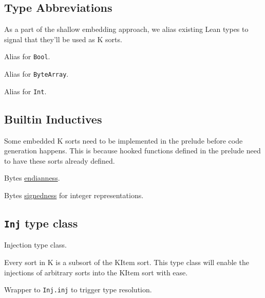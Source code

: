 \subsection{Type Abbreviations}

As a part of the shallow embedding approach, we alias existing Lean types to
signal that they'll be used as K sorts.

\begin{definition}[SortBool]\label{def:SortBool}\leanok
Alias for \texttt{Bool}.
\end{definition}
\begin{definition}[SortBytes]\label{def:SortBytes}\leanok
Alias for \texttt{ByteArray}.
\end{definition}
\begin{definition}[SortInt]\label{def:SortInt}\leanok
Alias for \texttt{Int}.
\end{definition}

\subsection{Builtin Inductives}

Some embedded K sorts need to be implemented in the prelude before code
generation happens. This is because hooked functions defined in the prelude need
to have these sorts already defined.

\begin{definition}[SortEndianness]\label{def:SortEndianness}\leanok
Bytes \href{https://en.wikipedia.org/wiki/Endianness}{endianness}.
\end{definition}
\begin{definition}[SortSignedness]\label{def:SortSignedness}\leanok
Bytes
\href{https://en.wikipedia.org/wiki/Signed_number_representations}{signedness}
for integer representations.
\end{definition}

\subsection{\texttt{Inj} type class}
\begin{definition}[Inj]\label{Inj}\leanok
Injection type class.

Every sort in K is a subsort of the KItem sort. This type class will enable the
injections of arbitrary sorts into the KItem sort with ease.
\end{definition}
\begin{definition}[inj]\label{inj}\leanok{}
Wrapper to \texttt{Inj.inj} to trigger type resolution.
\end{definition}


